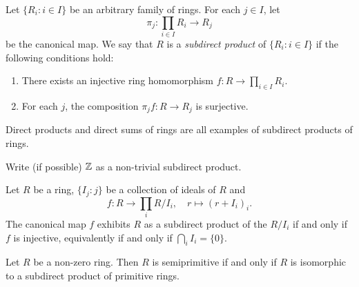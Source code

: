 
\begin{definition}
    Let $\{R_i:i\in I\}$ be an arbitrary family of rings. For each 
    $j\in I$, let 
    \[
    \pi_j\colon \prod_{i\in I}R_i\to R_j
    \]
    be the
    canonical map. We say that $R$ is a \emph{subdirect product}
    of $\{R_i:i\in I\}$ if the following conditions hold:
    \begin{enumerate}
        \item There exists an injective ring homomorphism $f\colon R\to \prod_{i\in I}R_i$. 
        \item For each $j$, the composition 
        $\pi_jf\colon R\to R_j$ is surjective. 
    \end{enumerate}
\end{definition}

Direct products and direct sums of rings are all examples of subdirect products of rings. 

\begin{exercise}
\label{xca:Z_semiprimitive}
    Write (if possible) $\mathbb{Z}$ as a non-trivial subdirect product. 
\end{exercise}

\begin{example}
    Let $R$ be a ring,  
    $\{I_j:j\}$ be a collection of ideals of $R$ and
    \[
    f\colon R\to \prod_i R/I_i,
    \quad
    r\mapsto (r+I_i)_i.
    \]
	The canonical map $f$ exhibits $R$ as a subdirect product
	of the $R/I_i$ if and only if $f$ is injective, equivalently
	if and only if $\bigcap_i I_i=\{0\}$.		
\end{example}



\begin{theorem}
	\label{thm:subdirecto}
	Let $R$ be a non-zero ring. Then $R$ is semiprimitive if and only if
	$R$ is isomorphic to a subdirect product of primitive rings. 
\end{theorem}

